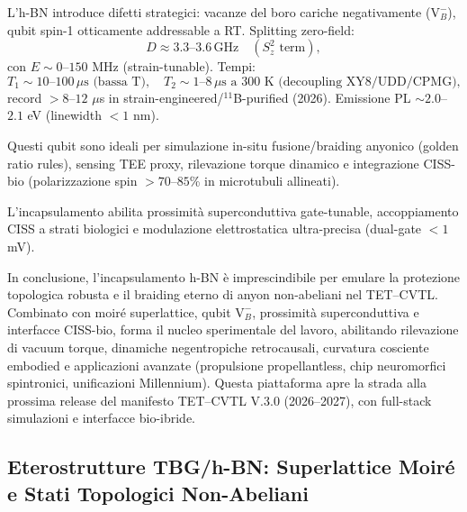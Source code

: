 \documentclass[11pt,a4paper]{article}
\theoremstyle{plain}
\theoremstyle{definition}
\begin{document}
L'h-BN introduce difetti strategici: vacanze del boro cariche negativamente ($\mathrm{V}_B^-$), qubit spin-1 otticamente addressable a RT. Splitting zero-field:
\begin{equation}
D \approx 3.3\text{--}3.6\,\text{GHz} \quad (S_z^2 \text{ term}),
\end{equation}
con $E \sim 0$--$150$ MHz (strain-tunable). Tempi:
\begin{equation}
T_1 \sim 10\text{--}100\,\mu\text{s (bassa T)}, \quad T_2 \sim 1\text{--}8\,\mu\text{s a 300 K (decoupling XY8/UDD/CPMG)},
\end{equation}
record $>8$–$12$ $\mu$s in strain-engineered/$^{11}$B-purified (2026). Emissione PL $\sim 2.0$--$2.1$ eV (linewidth $<1$ nm).

Questi qubit sono ideali per simulazione in-situ fusione/braiding anyonico (golden ratio rules), sensing TEE proxy, rilevazione torque dinamico e integrazione CISS-bio (polarizzazione spin $>70$--$85$\% in microtubuli allineati).

L'incapsulamento abilita prossimità superconduttiva gate-tunable, accoppiamento CISS a strati biologici e modulazione elettrostatica ultra-precisa (dual-gate $<1$ mV).

In conclusione, l'incapsulamento h-BN è imprescindibile per emulare la protezione topologica robusta e il braiding eterno di anyon non-abeliani nel TET--CVTL. Combinato con moiré superlattice, qubit $\mathrm{V}_B^-$, prossimità superconduttiva e interfacce CISS-bio, forma il nucleo sperimentale del lavoro, abilitando rilevazione di vacuum torque, dinamiche negentropiche retrocausali, curvatura cosciente embodied e applicazioni avanzate (propulsione propellantless, chip neuromorfici spintronici, unificazioni Millennium). Questa piattaforma apre la strada alla prossima release del manifesto TET--CVTL V.3.0 (2026--2027), con full-stack simulazioni e interfacce bio-ibride.

\vspace{0.4cm}




\subsection{Eterostrutture TBG/h-BN: Superlattice Moiré e Stati Topologici Non-Abeliani}
\end{document}
